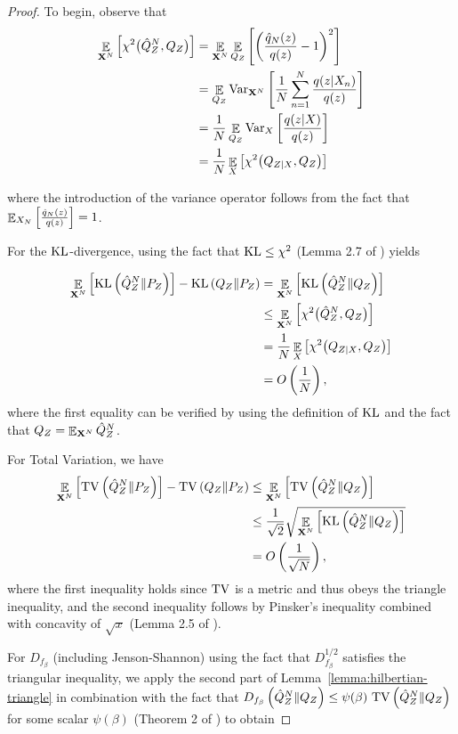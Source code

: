 \begin{proof}
To begin, observe that 
\begin{align*}
    \mathop{\mathbb{E}}_{\mathbf{X}^N}\left[\chi^2\bigl(\hat{Q}^N_Z, Q_Z\bigr)\right]
    &= \mathop{\mathbb{E}}_{\mathbf{X}^N}\mathop{\mathbb{E}}_{Q_Z}\left[\left(\frac{\hat{q}_N(z)}{q(z)} - 1\right)^2 \right]\\
    &=\mathop{\mathbb{E}}_{Q_Z} \text{Var}_{\mathbf{X}^N} \left[ \frac{1}{N} \sum_{n=1}^N\frac{q(z|X_n)}{q(z)}\right] \\
    &= \frac{1}{N} \mathop{\mathbb{E}}_{Q_Z}\text{Var}_X \left[ \frac{q(z|X)}{q(z)} \right]\\
    &= \frac{1}{N}\mathop{\mathbb{E}}_{X}\left[\chi^2\bigl(Q_{Z|X}, Q_Z\bigr) \right]
\end{align*}

where the introduction of the variance operator follows from the fact that $\mathop{\mathbb{E}}_{X_N}\left[ \frac{\hat{q}_N(z)}{q(z)} \right] = 1$.

For the $\mathrm{KL}$-divergence, using the fact that $\mathrm{KL} \leq \chi^2$ (Lemma 2.7 of \cite{tsybakov2009}) yields

\begin{align*}
    \mathop{\mathbb{E}}_{\mathbf{X}^N}\left[\mathrm{KL}\left( \hat{Q}^N_Z \| P_Z\right)\right] - \mathrm{KL}\left( Q_{Z} \| P_Z\right) &=\mathop{\mathbb{E}}_{\mathbf{X}^N}\left[\mathrm{KL}\left( \hat{Q}^N_Z \| Q_Z\right)\right]\\
    &\leq \mathop{\mathbb{E}}_{\mathbf{X}^N}\left[\chi^2\bigl(\hat{Q}^N_Z, Q_Z\bigr) \right]\\
    &= \frac{1}{N}\mathop{\mathbb{E}}_{X}\left[\chi^2\bigl(Q_{Z|X}, Q_Z\bigr)\right]\\
    &=O\left(\frac{1}{N}\right),
\end{align*}
where the first equality can be verified by using the definition of $\mathrm{KL}$ and the fact that $Q_Z = \mathop{\mathbb{E}}_{\mathbf{X}^N}\hat{Q}^N_Z$.

For Total Variation, we have
\begin{align*}
    \mathop{\mathbb{E}}_{\mathbf{X}^N}\left[\mathrm{TV}\left( \hat{Q}^N_Z \| P_Z\right)\right] - \mathrm{TV}\left( Q_{Z} \| P_Z\right) &\leq\mathop{\mathbb{E}}_{\mathbf{X}^N}\left[\mathrm{TV}\left( \hat{Q}^N_Z \| Q_Z\right)\right]\\
    &\leq \frac{1}{\sqrt{2}} \sqrt{\mathop{\mathbb{E}}_{\mathbf{X}^N}\left[\mathrm{KL}\left( \hat{Q}^N_Z \| Q_Z\right) \right]}\\
    &=O\left(\frac{1}{\sqrt{N}}\right),
\end{align*}
where the first inequality holds since $\mathrm{TV}$ is a metric and thus obeys the triangle inequality, and the second inequality follows by Pinsker's inequality combined with concavity of $\sqrt{x}$ (Lemma 2.5 of \cite{tsybakov2009}).

For $D_{f_\beta}$ (including Jenson-Shannon) using the fact that $D_{f_\beta}^{1/2}$ satisfies the triangular inequality, we apply the second part of Lemma~\ref{lemma:hilbertian-triangle}
in combination with the fact that
$D_{f_\beta}\left(\hat{Q}^N_Z \| Q_Z\right) \leq \psi(\beta) \ \mathrm{TV}\left( \hat{Q}^N_Z \| Q_Z \right)$ for some scalar $\psi(\beta)$ (Theorem 2 of \cite{osterreicher2003new}) to obtain


\end{proof}
